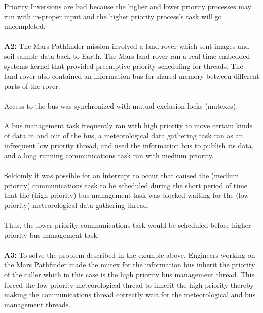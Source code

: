 \documentclass{article}
\begin{document}
Priority Inversions are bad because the higher and lower priority processes may run with in-proper input and the higher priority process's task will go uncompleted. \\
\\
\textbf{A2:} The Mars Pathfinder mission involved a land-rover which sent images and soil sample data back to Earth. The Mars land-rover ran a real-time embedded systems kernel that provided preemptive priority scheduling for threads. The land-rover also contained an information bus for shared memory between different parts of the rover. \\
\\
Access to the bus was synchronized with mutual exclusion locks (mutexes). \\
\\
A bus management task frequently ran with high priority to move certain kinds of data in and out of the bus, a meteorological data gathering task ran as an infrequent low priority thread, and used the information bus to publish its data, and a long running communications task ran with medium priority. \\
\\
Seldomly it was possible for an interrupt to occur that caused  the (medium priority) communications task to be scheduled during the short period of time that the (high priority) bus management task was blocked waiting for the (low priority) meteorological data gathering thread. \\
\\
Thus, the lower priority communications task would be scheduled before higher priority bus management task. \\
\\
\textbf{A3:} To solve the problem described in the example above, Engineers working on the Mars Pathfinder made the mutex for the information bus inherit the priority of the caller which 
in this case is the high priority bus management thread. This forced the low priority meteorological thread to inherit the high priority thereby making the communications thread correctly wait for the meteorological and bus management threads.
\end{document}
